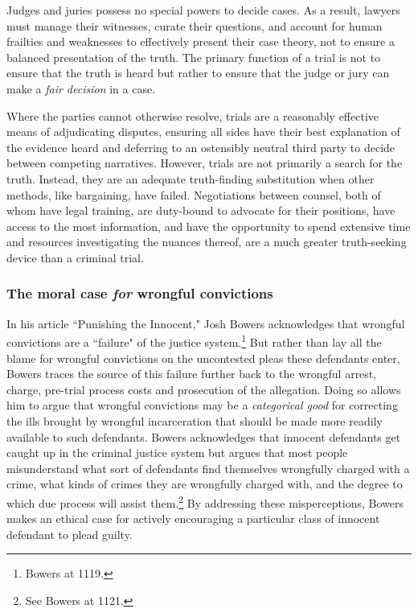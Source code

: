 Judges and juries possess no special powers to decide cases. As a result, lawyers must manage their witnesses, curate their questions, and account for human frailties and weaknesses to effectively present their case theory, not to ensure a balanced presentation of the truth. The primary function of a trial is not to ensure that the truth is heard but rather to ensure that the judge or jury can make a \textit{fair decision} in a case. 

Where the parties cannot otherwise resolve, trials are a reasonably effective means of adjudicating disputes, ensuring all sides have their best explanation of the evidence heard and deferring to an ostensibly neutral third party to decide between competing narratives. However, trials are not primarily a search for the truth. Instead, they are an adequate truth-finding substitution when other methods, like bargaining, have failed. Negotiations between counsel, both of whom have legal training, are duty-bound to advocate for their positions, have access to the most information, and have the opportunity to spend extensive time and resources investigating the nuances thereof, are a much greater truth-seeking device than a criminal trial.

\subsubsection{The moral case \textit{for} wrongful convictions}

In his article ``Punishing the Innocent," Josh Bowers acknowledges that wrongful convictions are a ``failure" of the justice system.\footnote{Bowers at 1119.} But rather than lay all the blame for wrongful convictions on the uncontested pleas these defendants enter, Bowers traces the source of this failure further back to the wrongful arrest, charge, pre-trial process costs and prosecution of the allegation. Doing so allows him to argue that wrongful convictions may be a \textit{categorical good} for correcting the ills brought by wrongful incarceration that should be made more readily available to such defendants. Bowers acknowledges that innocent defendants get caught up in the criminal justice system but argues that most people misunderstand what sort of defendants find themselves wrongfully charged with a crime, what kinds of crimes they are wrongfully charged with, and the degree to which due process will assist them.\footnote{See Bowers at 1121.} By addressing these misperceptions, Bowers makes an ethical case for actively encouraging a particular class of innocent defendant to plead guilty.

